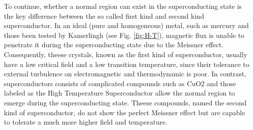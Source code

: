 To continue, whether a normal region can exist in the superconducting state is the key difference between the so called first kind and second kind superconductor.
In an ideal (pure and homogeneous) metal, such as mercury and those been tested by Kamerlingh (see Fig. \ref{fig:H-T}),
magnetic flux is unable to penetrate it during the superconducting state due to the Meissner effect.
Consequently, theese crystals, known as the first kind of superconductor,
usually have a low critical field and a low transition temperature,
since their tolerance to external turbulence on electromagnetic and thermodynamic is poor.
In contrast, superconductors consists of complicated compounds such as CuO2 and those labeled as the High Temperature Superconductor
allow the normal region to emerge during the superconducting state.
Theese compounds, named the second kind of superconductor,
do not show the perfect Meissner effect but are capable to tolerate a much more higher field and temperature.


\newpage
